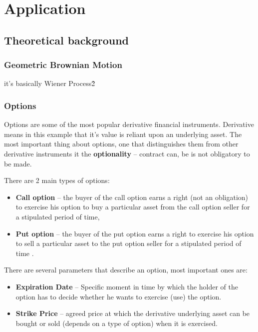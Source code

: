 \chapter{Application}
\section{Theoretical background}

\subsection{Geometric Brownian Motion}
\todo
it's basically Wiener Process\^2

\subsection{Options}
    Options are some of the most popular derivative financial instruments. Derivative means in this example that it's value is reliant upon an underlying asset. The most important thing about options, one that distinguishes them from other derivative instruments it the \textbf{optionality} -- contract can, be is not obligatory to be made.
    
    There are 2 main types of options:
    \begin{itemize}
        \item \textbf{Call option} -- the buyer of the call option earns a right (not an obligation) to exercise his option to buy a particular asset from the call option seller for a stipulated period of time,
        \item \textbf{Put option} -- the buyer of the put option earns a right to exercise his option to sell a particular asset to the put option seller for a stipulated period of time \cite{Call_Put_Option_Definition}.
    \end{itemize}
    
    There are several parameters that describe an option, most important ones are:
    \begin{itemize}
        \item \textbf{Expiration Date} -- Specific moment in time by which the holder of the option has to decide whether he wants to exercise (use) the option.
        \item \textbf{Strike Price} -- agreed price at which the derivative underlying asset can be bought or sold (depends on a type of option) when it is exercised.
    \end{itemize}
    
